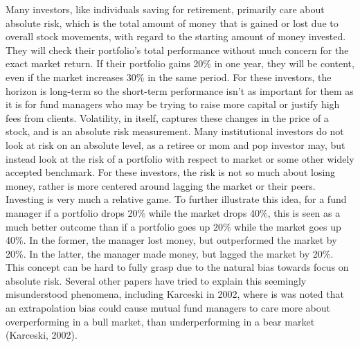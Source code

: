 \documentclass[12pt,twoside]{reedthesis}
\theoremstyle{definition}
\theoremstyle{definition}
\theoremstyle{definition}
\theoremstyle{remark}
\begin{document}
Many investors, like individuals saving for retirement, primarily care
about absolute risk, which is the total amount of money that is gained
or lost due to overall stock movements, with regard to the starting
amount of money invested. They will check their portfolio's total
performance without much concern for the exact market return. If their
portfolio gains 20\% in one year, they will be content, even if the
market increases 30\% in the same period. For these investors, the
horizon is long-term so the short-term performance isn't as important
for them as it is for fund managers who may be trying to raise more
capital or justify high fees from clients. Volatility, in itself,
captures these changes in the price of a stock, and is an absolute risk
measurement. Many institutional investors do not look at risk on an
absolute level, as a retiree or mom and pop investor may, but instead
look at the risk of a portfolio with respect to market or some other
widely accepted benchmark. For these investors, the risk is not so much
about losing money, rather is more centered around lagging the market or
their peers. Investing is very much a relative game. To further
illustrate this idea, for a fund manager if a portfolio drops 20\% while
the market drops 40\%, this is seen as a much better outcome than if a
portfolio goes up 20\% while the market goes up 40\%. In the former, the
manager lost money, but outperformed the market by 20\%. In the latter,
the manager made money, but lagged the market by 20\%. This concept can
be hard to fully grasp due to the natural bias towards focus on absolute
risk. Several other papers have tried to explain this seemingly
misunderstood phenomena, including Karceski in 2002, where is was noted
that an extrapolation bias could cause mutual fund managers to care more
about overperforming in a bull market, than underperforming in a bear
market (Karceski, 2002).
\end{document}
